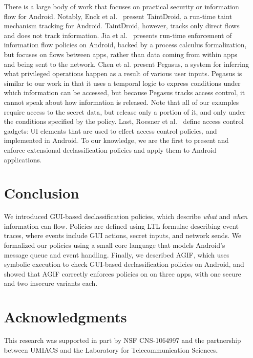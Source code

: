 \documentclass{entcs} \usepackage{entcsmacro}
\newcommand{\toolname}{AGIF\xspace}
\begin{document}
There is a large body of work that focuses on practical security or
information flow for Android.  Notably, Enck et al.~\cite{Enck:10}
present TaintDroid, a run-time taint mechanism tracking for Android.
TaintDroid, however, tracks only direct flows and does not track
information.
Jia et al.~\cite{Jia:13} presents run-time enforcement of
information flow policies on Android, backed by a process calculus
formalization, but focuses on flows between apps, rather than data
coming from within apps and being sent to the network.
Chen et al. \cite{Chen:13} present Pegasus, a system for inferring
what privileged operations happen as a result of various user inputs.
Pegasus is similar to our work in that it uses a temporal logic to
express conditions under which information can be accessed, but
because Pegasus tracks access control, it cannot speak about how
information is released.  Note that all of our examples require access
to the secret data, but release only a portion of it, and only under
the conditions specified by the policy.  Last, Roesner et
al.~\cite{Roesner:12} define access control gadgets: UI elements that
are used to effect access control policies, and implemented in Android.
 To our knowledge, we are the
first to present and enforce extensional declassification policies and
apply them to Android applications.

\section{Conclusion}
\label{sec:conclusion}

We introduced GUI-based declassification policies, which describe
\emph{what} and \emph{when} information can flow. Policies are defined
using LTL formulae describing event traces, where events include GUI
actions, secret inputs, and network sends. We formalized our policies
using a small core language that models Android's message queue and
event handling. Finally, we described \toolname{}, which uses symbolic
execution to check GUI-based declassification policies on Android, and
showed that \toolname{} correctly enforces policies on on three apps,
with one secure and two insecure variants each.

\section*{Acknowledgments}

This research was supported in part by NSF CNS-1064997 and the
partnership between UMIACS and the Laboratory for Telecommunication
Sciences.



\end{document}
